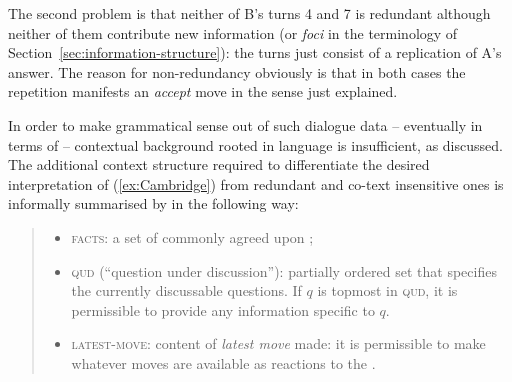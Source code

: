 \documentclass[output=paper]{langsci/langscibook}
\begin{document}
{The second problem is that neither of B's turns 4 and 7 is redundant although neither of them contribute new information (or \emph{foci} in the terminology of Section~\ref{sec:information-structure}): the turns just consist of a replication of A's answer.
%
The reason for non-redundancy obviously is that in both cases the repetition manifests an \emph{accept}  move in the sense just explained.


In order to make grammatical sense out of such dialogue data -- eventually in terms of  -- contextual background rooted in language  is insufficient, as discussed.
%
The additional context structure required to differentiate the desired interpretation of (\ref{ex:Cambridge}) from redundant and co-text insensitive ones is informally summarised by \citet[]{Ginzburg:1994} in the following way:
%
\begin{quote}
  \begin{itemize}
  \item \textsc{facts}:  a set of commonly agreed upon ;
  \item \textsc{qud}  (\enquote{question under discussion}):  partially ordered set that specifies the currently discussable questions. If $q$ is topmost in \textsc{qud}, it is permissible to provide any information specific to $q$.
  \item \textsc{latest-move}:  content of \emph{latest move} made: it is permissible to make whatever moves are available as reactions to the .
  \end{itemize}
\end{quote}

}
\end{document}
